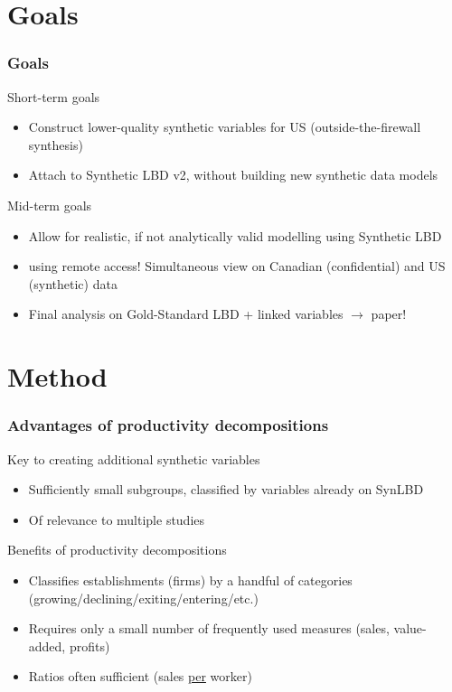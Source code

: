 \section{Goals}
\begin{frame}
\frametitle{Goals}
\begin{block}{Short-term goals}
\begin{itemize}[<+->]
\item Construct lower-quality synthetic variables for US (outside-the-firewall synthesis)
\item Attach to Synthetic LBD v2, without building new synthetic data models
\end{itemize}
\end{block}
\pause
\begin{block}{Mid-term goals}
\begin{itemize}[<+->]
\item Allow for realistic, if not analytically valid modelling using Synthetic LBD
\item using remote access! Simultaneous view on Canadian (confidential) and US (synthetic) data
\item Final analysis on Gold-Standard LBD + linked variables $\rightarrow$ paper! 
\end{itemize}
\end{block}
\end{frame}


\section{Method}
\begin{frame}
\frametitle{Advantages of productivity decompositions}
\begin{block}{Key to creating additional synthetic variables}
\begin{itemize}
\item Sufficiently small subgroups, classified by variables already on SynLBD
\item Of relevance to multiple studies
\end{itemize}
\end{block}
\begin{block}{Benefits of productivity decompositions}
\begin{itemize}
\item Classifies establishments (firms) by a handful of categories (growing/declining/exiting/entering/etc.)
\item Requires only a small number of frequently used measures (sales, value-added, profits)
\item Ratios often sufficient (sales \underline{per} worker)
\end{itemize}
\end{block}
\end{frame}

